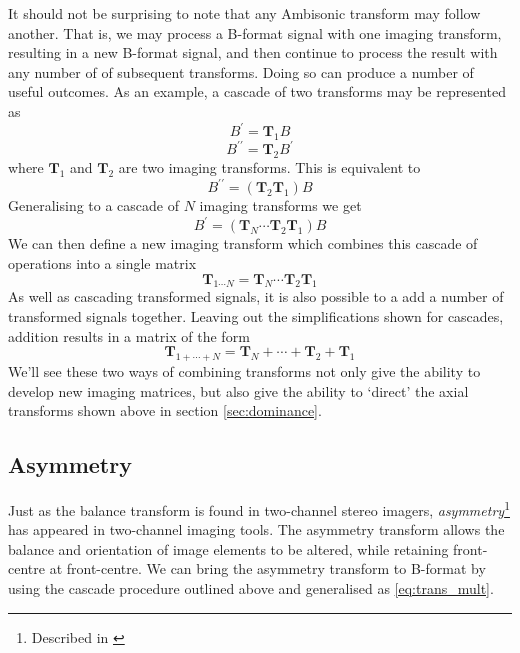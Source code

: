 \documentclass[12pt]{article}
\begin{document}
It should not be surprising to note that any Ambisonic transform may follow another. That is, we may process a B-format signal with one imaging transform, resulting in a new B-format signal, and then continue to process the result with any number of of subsequent transforms. Doing so can produce a number of useful outcomes. As an example, a cascade of two transforms may be represented as \begin{equation}
	B^\prime = \mathbf{T}_{1} B 
\end{equation}
\begin{equation}
	B^{\prime\prime} = \mathbf{T}_{2} B^\prime
\end{equation} where \(\mathbf{T}_{1}\) and \(\mathbf{T}_{2}\) are two imaging transforms. This is equivalent to \begin{equation}
	B^{\prime\prime} = (\mathbf{T}_{2} \mathbf{T}_{1}) B 
\end{equation} Generalising to a cascade of \(N\) imaging transforms we get \begin{equation}	\label{eq:trans_chain_1}
	B^\prime = (\mathbf{T}_{N}  \dotsm \mathbf{T}_{2} \mathbf{T}_{1}) B
\end{equation} We can then define a new imaging transform which combines this cascade of operations into a single matrix \begin{equation}	\label{eq:trans_mult}
	\mathbf{T}_{1 \dotsm N} = \mathbf{T}_{N}  \dotsm \mathbf{T}_{2} \mathbf{T}_{1}
\end{equation} As well as cascading transformed signals, it is also possible to a add a number of transformed signals together. Leaving out the simplifications shown for cascades, addition results in a matrix of the form\begin{equation}	\label{eq:trans_sum}
	\mathbf{T}_{1 + \dotsb + N} = \mathbf{T}_{N}  + \dotsb + \mathbf{T}_{2} + \mathbf{T}_{1}
\end{equation} We'll see these two ways of combining transforms not only give the ability to develop new imaging matrices, but also give the ability to `direct' the axial transforms shown above in section \ref{sec:dominance}.

\subsection{Asymmetry}

Just as the balance transform is found in two-channel stereo imagers, {\em asymmetry}\footnote{Described in \cite{anderson:09a}} has appeared in two-channel imaging tools. The asymmetry transform allows the balance and orientation of image elements to be altered, while retaining front-centre at front-centre. We can bring the asymmetry transform to B-format by using the cascade procedure outlined above and generalised as \eqref{eq:trans_mult}.
\end{document}
